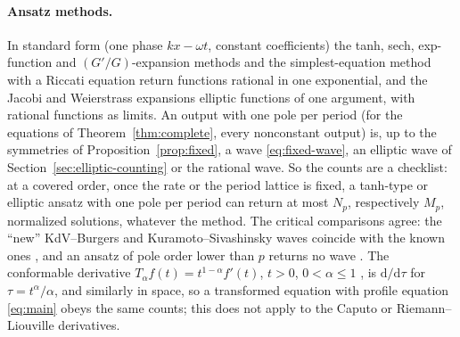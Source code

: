 \paragraph{Ansatz methods.}
In standard form (one phase \(kx-\omega t\), constant coefficients) the
tanh, sech, exp-function and \((G'/G)\)-expansion methods and the
simplest-equation method with a Riccati equation
\citep{Kudryashov2005Simplest} return functions rational in one
exponential, and the Jacobi and Weierstrass expansions
\citep{Kudryashov2009Errors} elliptic functions of one argument, with
rational functions as limits. An output with one pole per period (for
the equations of Theorem~\ref{thm:complete}, every nonconstant output)
is, up to the symmetries of Proposition~\ref{prop:fixed}, a wave
\eqref{eq:fixed-wave}, an elliptic wave of
Section~\ref{sec:elliptic-counting} or the rational wave. So the counts
are a checklist: at a covered order, once the rate or the period lattice
is fixed, a tanh-type or elliptic ansatz with one pole per period can
return at most \(N_p\), respectively \(M_p\), normalized solutions,
whatever the method. The critical comparisons
\citep{KudryashovLoguinova2009,Kudryashov2009Errors,KudryashovSoukharev2009}
agree: the ``new'' KdV--Burgers and Kuramoto--Sivashinsky waves coincide
with the known ones \citep{Kudryashov2009KdVB,KudryashovSoukharev2009},
and an ansatz of pole order lower than \(p\) returns no wave
\citep{Kudryashov2010Kawahara}. The conformable derivative
\(T_\alpha f(t)=t^{1-\alpha}f'(t)\), \(t>0\), \(0<\alpha\le1\)
\citep{KhalilEtAl2014}, is \(\mathrm d/\mathrm d\tau\) for
\(\tau=t^\alpha/\alpha\), and similarly in space, so a transformed
equation with profile equation \eqref{eq:main} obeys the same counts;
this does not apply to the Caputo or Riemann--Liouville derivatives.
